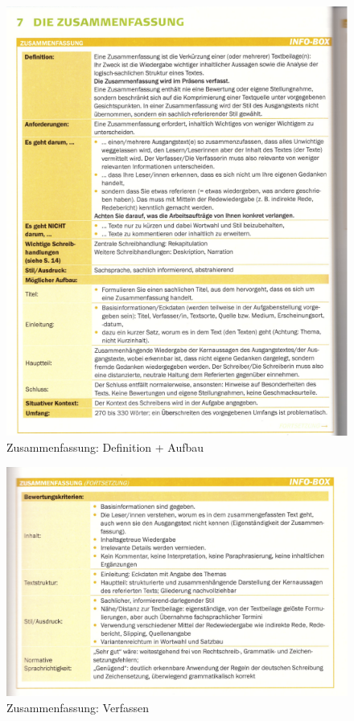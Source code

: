 \begin{figure}[h][p]
    \centering
    \includegraphics[scale=0.8]{./pics/Screenshot from 2023-02-06 12-32-33.png}
    \caption{Zusammenfassung: Definition + Aufbau}
    \label{fig:impl:Zusammenfassung1}
\end{figure}
\begin{figure}[h]
    \centering
    \includegraphics[scale=0.8]{./pics/Screenshot from 2023-02-06 12-33-05.png}
    \caption{Zusammenfassung: Verfassen}
    \label{fig:impl:Zusammenfassung2}
\end{figure}
